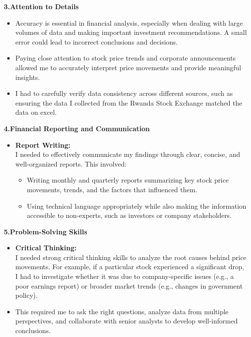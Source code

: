 \documentclass{article}
\begin{document}
\begin{titlepage}
\begin{titlepage}
\begin{flushleft}
\begin{flushleft}
\begin{itemize}
\end{itemize}
\vspace{0.3cm}
\newpage

\textbf{3.Attention to Details }
\begin{itemize}
\item Accuracy is essential in financial analysis, especially when dealing with large volumes of data and making important investment recommendations. A small error could lead to incorrect conclusions and decisions.
\item Paying close attention to stock price trends and corporate announcements allowed me to accurately interpret price movements and provide meaningful insights.
\item I had to carefully verify data consistency across different sources, such as ensuring the data I collected from the Rwanda Stock Exchange matched the data on excel.
\end{itemize}


\setcounter{page}{13}

\vspace{1cm}

\textbf{4.Financial Reporting and Communication }

\begin{itemize}
\item \textbf{Report Writing:}\\

I needed to effectively communicate my findings through clear, concise, and well-organized reports. This involved:
\begin{itemize}
    \item Writing monthly and quarterly reports summarizing key stock price movements, trends, and the factors that influenced them.
    \item Using technical language appropriately while also making the information accessible to non-experts, such as investors or company stakeholders. 
\end{itemize}
\end{itemize}
\vspace{0.4cm}

\textbf{5.Problem-Solving Skills}

\begin{itemize}
\item \textbf{Critical Thinking:}
\\

I needed strong critical thinking skills to analyze the root causes behind price movements. For example, if a particular stock experienced a significant drop, I had to investigate whether it was due to company-specific issues (e.g., a poor earnings report) or broader market trends (e.g., changes in government policy).
\item This required me to ask the right questions, analyze data from multiple perspectives, and collaborate with senior analysts to develop well-informed conclusions.
\end{itemize}


\end{flushleft}
\end{flushleft}
\end{titlepage}
\end{titlepage}
\end{document}
